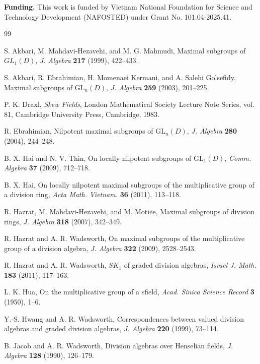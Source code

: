 \documentclass[11pt]{amsart}
\theoremstyle{definition}
\begin{document}
{\noindent\textbf{Funding.} This work is funded by Vietnam National Foundation
for Science and Technology Development (NAFOSTED) under Grant No.
101.04-2025.41.}


\begin{thebibliography}{99}

S. Akbari, M. Mahdavi-Hezavehi, and M. G. Mahmudi,
Maximal subgroups of \(GL_1(D)\),
\emph{J. Algebra} \textbf{217} (1999), 422--433.

S. Akbari, R. Ebrahimian, H. Momenaei Kermani, and A. Salehi Golsefidy,
Maximal subgroups of \(\mathrm{GL}_n(D)\),
\emph{J. Algebra} \textbf{259} (2003), 201--225.

P. K. Draxl,
\emph{Skew Fields},
London Mathematical Society Lecture Note Series, vol. 81,
Cambridge University Press, Cambridge, 1983.

R. Ebrahimian,
Nilpotent maximal subgroups of \(\mathrm{GL}_n(D)\),
\emph{J. Algebra} \textbf{280} (2004), 244--248.

B. X. Hai and N. V. Thin,
On locally nilpotent subgroups of \(\mathrm{GL}_1(D)\),
\emph{Comm. Algebra} \textbf{37} (2009), 712--718.

B. X. Hai,
On locally nilpotent maximal subgroups of the multiplicative group of a
division ring,
\emph{Acta Math. Vietnam.} \textbf{36} (2011), 113--118.

R. Hazrat, M. Mahdavi-Hezavehi, and M. Motiee,
Maximal subgroups of division rings,
\emph{J. Algebra} \textbf{318} (2007), 342--349.

R. Hazrat and A. R. Wadsworth,
On maximal subgroups of the multiplicative group of a division algebra,
\emph{J. Algebra} \textbf{322} (2009), 2528--2543.

R. Hazrat and A. R. Wadsworth,
\(SK_1\) of graded division algebras,
\emph{Israel J. Math.} \textbf{183} (2011), 117--163.

L. K. Hua,
On the multiplicative group of a sfield,
\emph{Acad. Sinica Science Record} \textbf{3} (1950), 1--6.

Y.-S. Hwang and A. R. Wadsworth,
Correspondences between valued division algebras and graded division algebras,
\emph{J. Algebra} \textbf{220} (1999), 73--114.

B. Jacob and A. R. Wadsworth,
Division algebras over Henselian fields,
\emph{J. Algebra} \textbf{128} (1990), 126--179.


\end{thebibliography}
\end{document}
